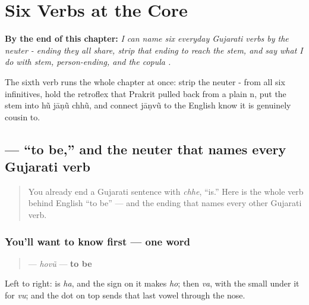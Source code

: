 
\chapter{Six Verbs at the Core}
\label{ch:gu-core-verbs}

\begin{chapteropening}
\textbf{By the end of this chapter:} \emph{I can name six everyday Gujarati verbs by the neuter - ending they all share, strip that ending to reach the stem, and say what I do with stem, person-ending, and the copula .}

The sixth verb runs the whole chapter at once: strip the neuter - from all six infinitives, hold the retroflex  that Prakrit pulled back from a plain n, put the stem into hũ jāṇũ chhũ, and connect jāṇvũ to the English know it is genuinely cousin to.
\end{chapteropening}

\section[\texorpdfstring{\gu{હોવું} (hovũ)}{હોવું (hovũ)}]{ — \textquotedblleft{}to be,\textquotedblright{} and the neuter that names every Gujarati verb}

\label{lesson:GU-C07-hovun}



\begin{quote}
You already end a Gujarati sentence with \textbf{} \emph{chhe}, \textquotedblleft{}is.\textquotedblright{} Here is the whole verb behind English \textquotedblleft{}to be\textquotedblright{} — and the ending that names every other Gujarati verb.
\end{quote}

\subsection*{You'll want to know first — one word}
\begin{quote}
\textbf{} — \emph{hovũ} — \textbf{to be}
\end{quote}

Left to right: \textbf{} is \emph{ha}, and the sign \textbf{} on it makes \emph{ho}; then \textbf{} \emph{va}, with the small \textbf{} under it for \emph{vu}; and the dot \textbf{} on top sends that last vowel through the nose.


